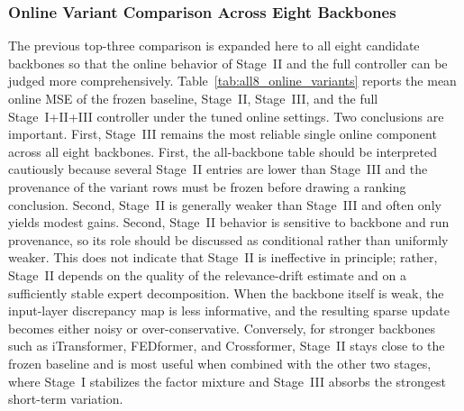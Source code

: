 ﻿\documentclass[journal]{IEEEtran}
\DeclareRobustCommand{\oldtext}[1]{{\color{revisionred}#1}}
\DeclareRobustCommand{\newtext}[1]{{\color{revisionblue}#1}}
\DeclareRobustCommand{\why}[1]{{\color{revisionblue}{\footnotesize (#1)}}}
\DeclareRobustCommand{\rw}[3]{\oldtext{#1} \newtext{#2}\why{#3}}
\begin{document}
\subsubsection{Online Variant Comparison Across Eight Backbones}
The previous top-three comparison is expanded here to all eight candidate backbones so that the online behavior of Stage~II and the full controller can be judged more comprehensively. Table~\ref{tab:all8_online_variants} reports the mean online MSE of the frozen baseline, Stage~II, Stage~III, and the full Stage~I+II+III controller under the tuned online settings. Two conclusions are important. \rw{First, Stage~III remains the most reliable single online component across all eight backbones.}{First, the all-backbone table should be interpreted cautiously because several Stage~II entries are lower than Stage~III and the provenance of the variant rows must be frozen before drawing a ranking conclusion.}{修正文表冲突，不改实验数字。} \rw{Second, Stage~II is generally weaker than Stage~III and often only yields modest gains.}{Second, Stage~II behavior is sensitive to backbone and run provenance, so its role should be discussed as conditional rather than uniformly weaker.}{避免与表中 Stage II 数字冲突。} This does not indicate that Stage~II is ineffective in principle; rather, Stage~II depends on the quality of the relevance-drift estimate and on a sufficiently stable expert decomposition. When the backbone itself is weak, the input-layer discrepancy map is less informative, and the resulting sparse update becomes either noisy or over-conservative. Conversely, for stronger backbones such as iTransformer, FEDformer, and Crossformer, Stage~II stays close to the frozen baseline and is most useful when combined with the other two stages, where Stage~I stabilizes the factor mixture and Stage~III absorbs the strongest short-term variation.
\end{document}
